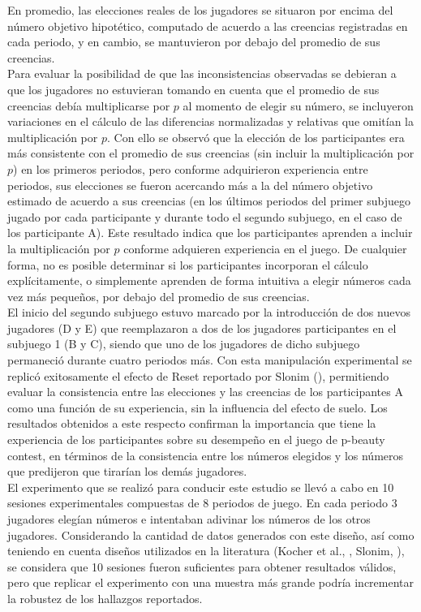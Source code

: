 En promedio, las elecciones reales de los jugadores se situaron por encima del número objetivo hipotético, computado de acuerdo a las creencias registradas en cada periodo, y en cambio, se mantuvieron por debajo del promedio de sus creencias.\\

Para evaluar la posibilidad de que las inconsistencias observadas se debieran a que los jugadores no estuvieran tomando en cuenta que el promedio de sus creencias debía multiplicarse por $p$ al momento de elegir su número, se incluyeron variaciones en el cálculo de las diferencias normalizadas y relativas que omitían la multiplicación por $p$. Con ello se observó que la elección de los participantes era más consistente con el promedio de sus creencias (sin incluir la multiplicación por $p$) en los primeros periodos, pero conforme adquirieron experiencia entre periodos, sus elecciones se fueron acercando más a la del número objetivo estimado de acuerdo a sus creencias (en los últimos periodos del primer subjuego jugado por cada participante y durante todo el segundo subjuego, en el caso de los participante A). Este resultado indica que los participantes aprenden a incluir la multiplicación por $p$ conforme adquieren experiencia en el juego. De cualquier forma, no es posible determinar si los participantes incorporan el cálculo explícitamente, o simplemente aprenden de forma intuitiva a elegir números cada vez más pequeños, por debajo del promedio de sus creencias.\\

El inicio del segundo subjuego estuvo marcado por la introducción de dos nuevos jugadores (D y E) que reemplazaron a dos de los jugadores participantes en el subjuego 1 (B y C), siendo que uno de los jugadores de dicho subjuego permaneció durante cuatro periodos más. Con esta manipulación experimental se replicó exitosamente el efecto de Reset reportado por Slonim (\citeyear{Slonim}), permitiendo evaluar la consistencia entre las elecciones y las creencias de los participantes A como una función de su experiencia, sin la influencia del efecto de suelo. Los resultados obtenidos a este respecto confirman la importancia que tiene la experiencia de los participantes sobre su desempeño en el juego de p-beauty contest, en términos de la consistencia entre los números elegidos y los números que predijeron que tirarían los demás jugadores. \\

El experimento que se realizó para conducir este estudio se llevó a cabo en 10 sesiones experimentales compuestas de 8 periodos de juego. En cada periodo 3 jugadores elegían números e intentaban adivinar los números de los otros jugadores. Considerando la cantidad de datos generados con este diseño, así como teniendo en cuenta diseños utilizados en la literatura (Kocher et al., \citeyear{Kocher}, Slonim, \citeyear{Slonim}), se considera que 10 sesiones fueron suficientes para obtener resultados válidos, pero que replicar el experimento con una muestra más grande podría incrementar la robustez de los hallazgos reportados.\\

